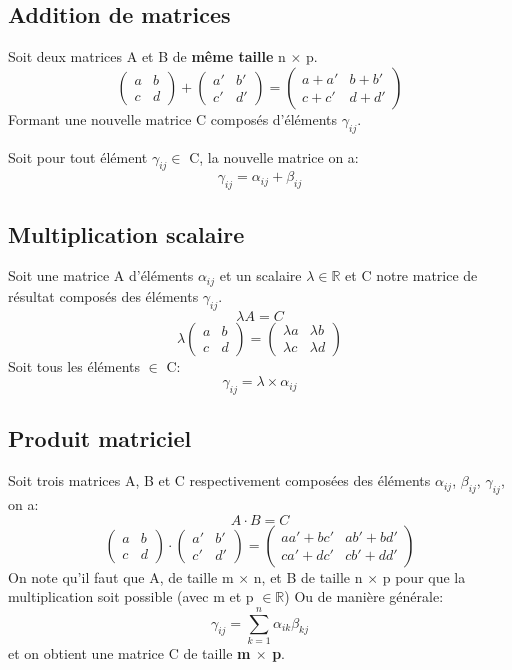 \documentclass[10pt,a4paper]{book}
\newcommand{\R}{\mathbb{R}}
\newcommand{\x}{$\times$ }
\begin{document}
\subsection{Addition de matrices}

Soit deux matrices A et B de \textbf{même taille} n \x p. 
\[
\begin{pmatrix}
a & b \\
c & d
\end{pmatrix}
+
\begin{pmatrix}
a' & b' \\
c' & d'
\end{pmatrix}
=
\begin{pmatrix}
a + a' & b + b' \\
c + c' & d + d'
\end{pmatrix}
\]
Formant une nouvelle matrice C composés d'éléments $\gamma_{ij}$. \par
Soit pour tout élément $\gamma_{ij} \in$ C, la nouvelle matrice on a:
\[\gamma_{ij} = \alpha_{ij} + \beta_{ij}\]

\subsection{Multiplication scalaire}

Soit une matrice A d'éléments $\alpha_{ij}$ et un scalaire $\lambda \in \R$ et C notre matrice de résultat composés des éléments $\gamma_{ij}$.
\[\lambda A = C\]
\[\lambda
\begin{pmatrix}
a & b \\
c & d
\end{pmatrix}
=
\begin{pmatrix}
\lambda a & \lambda b \\
\lambda c & \lambda d 
\end{pmatrix}\]
Soit tous les éléments $\in$ C:
\[\gamma_{ij} = \lambda \times \alpha_{ij}\]

\subsection{Produit matriciel}
Soit trois matrices A, B et C respectivement composées des éléments $\alpha_{ij}$, $\beta_{ij}$, $\gamma_{ij}$, on a:
\[A \cdot B = C\]
\[\begin{pmatrix}
a & b \\
c & d
\end{pmatrix}
\cdot
\begin{pmatrix}
a' & b' \\
c' & d'
\end{pmatrix}
=
\begin{pmatrix}
aa' + bc'  & ab' + bd' \\
ca' + dc' & cb' + dd'
\end{pmatrix}\]
On note qu'il faut que A, de taille m \x n, et B de taille n \x p pour que la multiplication soit possible (avec m et p $\in \R$)
Ou de manière générale:
\[\gamma_{ij} = \sum_{k=1}^n \alpha_{ik} \beta_{kj}\]
et on obtient une matrice C de taille \textbf{m \x p}.
\end{document}
